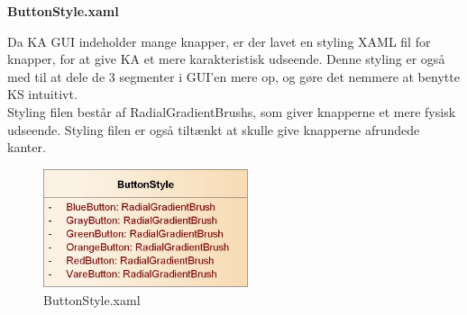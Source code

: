 \textbf{ButtonStyle.xaml}

Da \gls{KA} \gls{GUI} indeholder mange knapper, er der lavet en styling XAML fil for knapper, for at give \gls{KA} et mere karakteristisk udseende. Denne styling er også med til at dele de 3 segmenter i GUI'en mere op, og gøre det nemmere at benytte \gls{KS} intuitivt. \\
Styling filen består af RadialGradientBrushs, som giver knapperne et mere fysisk udseende. Styling filen er også tiltænkt at skulle give knapperne afrundede kanter.

\begin{figure}[H]
	\centering
	\includegraphics[width=60mm]{Systemdesign/Frontend/GUI/Pics/xaml}
	\caption{ButtonStyle.xaml}
	\label{fig:ButtonStyleXaml}
\end{figure}
